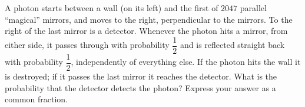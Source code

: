 A photon starts between a wall (on its left) and the first of $2047$ parallel ``magical'' mirrors, and moves to the right, perpendicular to the mirrors. To the right of the last mirror is a detector. Whenever the photon hits a mirror, from either side, it passes through with probability $\dfrac{1}{2}$ and is reflected straight back with probability $\dfrac{1}{2}$, independently of everything else. If the photon hits the wall it is destroyed; if it passes the last mirror it reaches the detector. What is the probability that the detector detects the photon? Express your answer as a common fraction.
